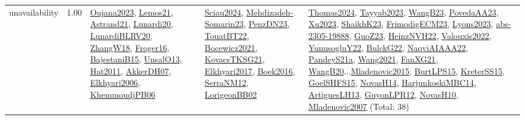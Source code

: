 {\begin{longtable}{p{3cm}r>{\raggedright\arraybackslash}p{6cm}>{\raggedright\arraybackslash}p{6cm}>{\raggedright\arraybackslash}p{8cm}}
\index{unavailability}\index{Concepts!unavailability}unavailability &  1.00 & \hyperref[detail:Oujana2023]{Oujana2023}, \hyperref[detail:Lemos21]{Lemos21}, \hyperref[detail:Astrand21]{Astrand21}, \hyperref[detail:Lunardi20]{Lunardi20}, \hyperref[detail:LunardiBLRV20]{LunardiBLRV20}, \hyperref[detail:ZhangW18]{ZhangW18}, \hyperref[detail:Froger16]{Froger16}, \hyperref[detail:BajestaniB15]{BajestaniB15}, \hyperref[detail:UnsalO13]{UnsalO13}, \hyperref[detail:Hat2011]{Hat2011}, \hyperref[detail:AkkerDH07]{AkkerDH07}, \hyperref[detail:Elkhyari2006]{Elkhyari2006}, \hyperref[detail:KhemmoudjPB06]{KhemmoudjPB06} & \hyperref[detail:Sciau2024]{Sciau2024}, \hyperref[detail:Mehdizadeh-Somarin23]{Mehdizadeh-Somarin23}, \hyperref[detail:PenzDN23]{PenzDN23}, \hyperref[detail:TouatBT22]{TouatBT22}, \hyperref[detail:Bocewicz2021]{Bocewicz2021}, \hyperref[detail:KovacsTKSG21]{KovacsTKSG21}, \hyperref[detail:Elkhyari2017]{Elkhyari2017}, \hyperref[detail:Boek2016]{Boek2016}, \hyperref[detail:SerraNM12]{SerraNM12}, \hyperref[detail:LorigeonBB02]{LorigeonBB02} & \hyperref[detail:Thomas2024]{Thomas2024}, \hyperref[detail:Tayyab2023]{Tayyab2023}, \hyperref[detail:WangB23]{WangB23}, \hyperref[detail:PovedaAA23]{PovedaAA23}, \hyperref[detail:Xu2023]{Xu2023}, \hyperref[detail:ShaikhK23]{ShaikhK23}, \hyperref[detail:FrimodigECM23]{FrimodigECM23}, \hyperref[detail:Lyons2023]{Lyons2023}, \hyperref[detail:abs-2305-19888]{abs-2305-19888}, \hyperref[detail:GuoZ23]{GuoZ23}, \hyperref[detail:HeinzNVH22]{HeinzNVH22}, \hyperref[detail:Valouxis2022]{Valouxis2022}, \hyperref[detail:YunusogluY22]{YunusogluY22}, \hyperref[detail:BulckG22]{BulckG22}, \hyperref[detail:NaqviAIAAA22]{NaqviAIAAA22}, \hyperref[detail:PandeyS21a]{PandeyS21a}, \hyperref[detail:Wang2021]{Wang2021}, \hyperref[detail:FanXG21]{FanXG21}, \hyperref[detail:WangB20]{WangB20}...\hyperref[detail:Mladenovic2015]{Mladenovic2015}, \hyperref[detail:BurtLPS15]{BurtLPS15}, \hyperref[detail:KreterSS15]{KreterSS15}, \hyperref[detail:GoelSHFS15]{GoelSHFS15}, \hyperref[detail:NovasH14]{NovasH14}, \hyperref[detail:HarjunkoskiMBC14]{HarjunkoskiMBC14}, \hyperref[detail:ArtiguesLH13]{ArtiguesLH13}, \hyperref[detail:GuyonLPR12]{GuyonLPR12}, \hyperref[detail:NovasH10]{NovasH10}, \hyperref[detail:Mladenovic2007]{Mladenovic2007} (Total: 38)\\
\end{longtable}
}

\clearpage
